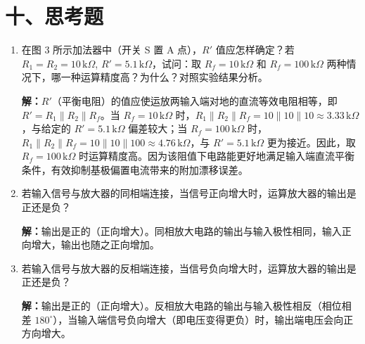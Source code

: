 \documentclass[a4paper,12pt]{article}
\begin{document}
\section*{十、思考题}
\begin{enumerate}
    \item 在图 3 所示加法器中（开关 S 置 A 点），$R'$ 值应怎样确定？若 $R_1 = R_2 = 10\,\mathrm{k}\Omega$, $R' = 5.1\,\mathrm{k}\Omega$，试问：取 $R_f = 10\,\mathrm{k}\Omega$ 和 $R_f = 100\,\mathrm{k}\Omega$ 两种情况下，哪一种运算精度高？为什么？对照实验结果分析。
    
    \textbf{解：}$R'$（平衡电阻）的值应使运放两输入端对地的直流等效电阻相等，即 $R' = R_1 \parallel R_2 \parallel R_f$。当 $R_f = 10\,\mathrm{k}\Omega$ 时，$R_1 \parallel R_2 \parallel R_f = 10 \parallel 10 \parallel 10 \approx 3.33\,\mathrm{k}\Omega$，与给定的 $R' = 5.1\,\mathrm{k}\Omega$ 偏差较大；当 $R_f = 100\,\mathrm{k}\Omega$ 时，$R_1 \parallel R_2 \parallel R_f = 10 \parallel 10 \parallel 100 \approx 4.76\,\mathrm{k}\Omega$，与 $R' = 5.1\,\mathrm{k}\Omega$ 更为接近。因此，取 $R_f = 100\,\mathrm{k}\Omega$ 时运算精度高。因为该阻值下电路能更好地满足输入端直流平衡条件，有效抑制基极偏置电流带来的附加漂移误差。
    
    \item 若输入信号与放大器的同相端连接，当信号正向增大时，运算放大器的输出是正还是负？
    
    \textbf{解：}输出是正的（正向增大）。同相放大电路的输出与输入极性相同，输入正向增大，输出也随之正向增加。
    
    \item 若输入信号与放大器的反相端连接，当信号负向增大时，运算放大器的输出是正还是负？
    
    \textbf{解：}输出是正的（正向增大）。反相放大电路的输出与输入极性相反（相位相差 $180^\circ$），当输入端信号负向增大（即电压变得更负）时，输出端电压会向正方向增大。
\end{enumerate}
\end{document}
